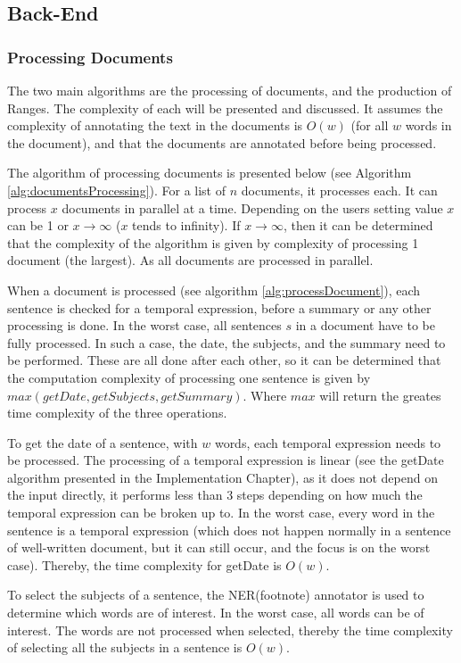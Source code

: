 \subsection{Back-End}
\subsubsection{Processing Documents}
\par The two main algorithms are the processing of documents, and the production of Ranges. The complexity of each will be presented and discussed. It assumes the complexity of annotating the text in the documents is $O(w)$ (for all $w$ words in the document), and that the documents are annotated before being processed.
\par The algorithm of processing documents is presented below (see Algorithm \ref{alg:documentsProcessing}). For a list of $n$ documents, it processes each. It can process $x$ documents in parallel at a time. Depending on the users setting value $x$ can be 1 or ${x\to\infty}$ ($x$ tends to infinity). If ${x\to\infty}$, then it can be determined that the complexity of the algorithm is given by complexity of processing 1 document (the largest). As all documents are processed in parallel. \par When a document is processed (see algorithm \ref{alg:processDocument}), each sentence is checked for a temporal expression, before a summary or any other processing is done. In the worst case, all sentences $s$ in a document have to be fully processed. In such a case, the date, the subjects, and the summary need to be performed. These are all done after each other, so it can be determined that the computation complexity of processing one sentence is given by $max(getDate, getSubjects, getSummary)$. Where $max$ will return the greates time complexity of the three operations. 
\par To get the date of a sentence, with $w$ words, each temporal expression needs to be processed. The processing of a temporal expression is linear (see the getDate algorithm presented in the Implementation Chapter), as it does not depend on the input directly, it performs less than 3 steps depending on how much the temporal expression can be broken up to. In the worst case, every word in the sentence is a temporal expression (which does not happen normally in a sentence of well-written document, but it can still occur, and the focus is on the worst case). Thereby, the time complexity for getDate is $O(w)$.
\par To select the subjects of a sentence, the NER(footnote) annotator is used to determine which words are of interest. In the worst case, all words can be of interest. The words are not processed when selected, thereby the time complexity of selecting all the subjects in a sentence is $O(w)$.
